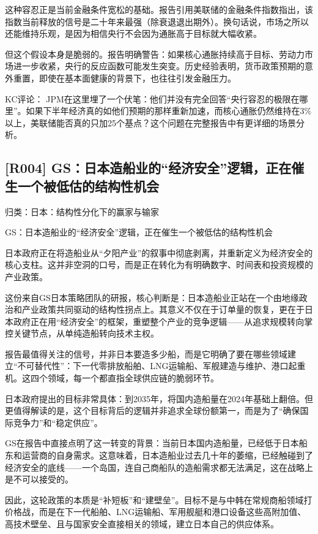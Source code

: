 \documentclass[11pt]{ctexart}
\begin{document}
这种容忍正是当前金融条件宽松的基础。报告引用美联储的金融条件指数指出，该指数当前释放的信号是二十年来最强（除衰退退出期外）。换句话说，市场之所以还能维持乐观，是因为相信央行不会因为通胀高于目标就大幅收紧。

但这个假设本身是脆弱的。报告明确警告：如果核心通胀持续高于目标、劳动力市场进一步收紧，央行的反应函数可能发生突变。历史经验表明，货币政策预期的意外重置，即使在基本面健康的背景下，也往往引发金融压力。

KC评论： JPM在这里埋了一个伏笔：他们并没有完全回答“央行容忍的极限在哪里”。如果下半年经济真的如他们预期的那样重新加速，而核心通胀仍然维持在3\%以上，美联储能否真的只加25个基点？这个问题在完整报告中有更详细的场景分析。

\subsection{[R004] GS：日本造船业的“经济安全”逻辑，正在催生一个被低估的结构性机会}
{\small\color{refgray}归类：日本：结构性分化下的赢家与输家}

GS：日本造船业的“经济安全”逻辑，正在催生一个被低估的结构性机会

日本政府正在将造船业从“夕阳产业”的叙事中彻底剥离，并重新定义为经济安全的核心支柱。这并非空洞的口号，而是正在转化为有明确数字、时间表和投资规模的产业政策。

这份来自GS日本策略团队的研报，核心判断是：日本造船业正站在一个由地缘政治和产业政策共同驱动的结构性拐点上。其意义不仅在于订单量的恢复，更在于日本政府正在用“经济安全”的框架，重塑整个产业的竞争逻辑——从追求规模转向掌控关键节点，从单纯造船转向技术主权。

报告最值得关注的信号，并非日本要造多少船，而是它明确了要在哪些领域建立“不可替代性”：下一代零排放船舶、LNG运输船、军舰建造与维护、港口起重机。这四个领域，每一个都直指全球供应链的脆弱环节。

日本政府提出的目标非常具体：到2035年，将国内造船量在2024年基础上翻倍。但更值得解读的是，这个目标背后的逻辑并非追求全球份额第一，而是为了“确保国际竞争力”和“稳定供应”。

GS在报告中直接点明了这一转变的背景：当前日本国内造船量，已经低于日本船东和运营商的自身需求。这意味着，日本造船业过去几十年的萎缩，已经触碰到了经济安全的底线——一个岛国，连自己商船队的造船需求都无法满足，这在战略上是不可以接受的。

因此，这轮政策的本质是“补短板”和“建壁垒”。目标不是与中韩在常规商船领域打价格战，而是在下一代船舶、LNG运输船、军用舰艇和港口设备这些高附加值、高技术壁垒、且与国家安全直接相关的领域，建立日本自己的供应体系。
\end{document}
